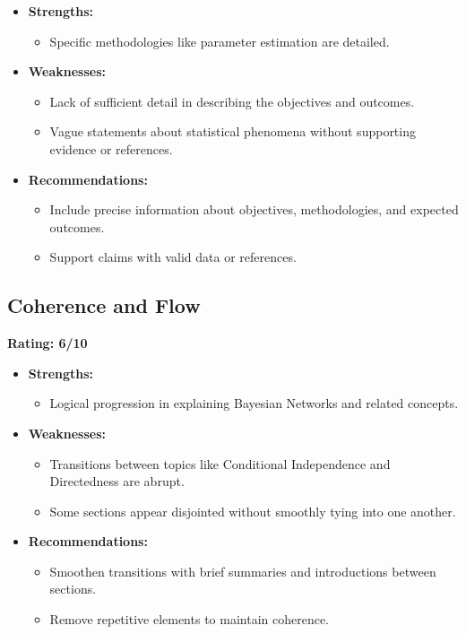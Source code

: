 \documentclass{article}
\begin{document}
\begin{itemize}
    \item \textbf{Strengths:}
    \begin{itemize}
        \item Specific methodologies like parameter estimation are detailed.
    \end{itemize}
    \item \textbf{Weaknesses:}
    \begin{itemize}
        \item Lack of sufficient detail in describing the objectives and outcomes.
        \item Vague statements about statistical phenomena without supporting evidence or references.
    \end{itemize}
    \item \textbf{Recommendations:}
    \begin{itemize}
        \item Include precise information about objectives, methodologies, and expected outcomes.
        \item Support claims with valid data or references.
    \end{itemize}
\end{itemize}

\subsection{Coherence and Flow}
\textbf{Rating: 6/10}

\begin{itemize}
    \item \textbf{Strengths:}
    \begin{itemize}
        \item Logical progression in explaining Bayesian Networks and related concepts.
    \end{itemize}
    \item \textbf{Weaknesses:}
    \begin{itemize}
        \item Transitions between topics like Conditional Independence and Directedness are abrupt.
        \item Some sections appear disjointed without smoothly tying into one another.
    \end{itemize}
    \item \textbf{Recommendations:}
    \begin{itemize}
        \item Smoothen transitions with brief summaries and introductions between sections.
        \item Remove repetitive elements to maintain coherence.
    \end{itemize}
\end{itemize}
\end{document}
